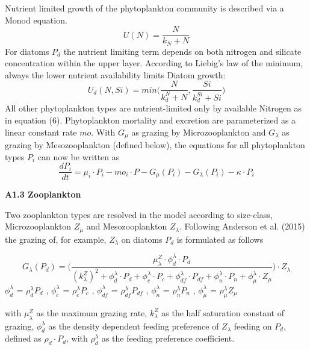 \documentclass[11pt,letterpaper,english]{article}
\begin{document}
Nutrient limited growth of the phytoplankton community is described via a Monod equation. 
\begin{equation}
U(N) = \frac{N} {k_N + N}
\end{equation}
For diatoms $P_d$ the nutrient limiting term depends on both nitrogen and silicate concentration within the upper layer. According to Liebig's law of the minimum, always the lower nutrient availability limits Diatom growth:
\begin{equation}
U_{d}(N,Si) = min \Big( \frac{N} {k_{d}^N + N}, \frac{Si} {k_{d}^{Si} + Si} \Big)
\end{equation}
All other phytoplankton types are nutrient-limited only by available Nitrogen as in equation (6). Phytoplankton mortality and excretion are parameterized as a linear constant rate $mo$. With $G_{\mu}$ as grazing by Microzooplankton and $G_{\lambda}$ as grazing by Mesozooplankton (defined below), the equations for all phytoplankton types $P_i$ can now be written as
\begin{equation}
\frac{dP_{i}}{dt} = \mu_{i} \cdot P_{i} - mo_{i} \cdot P - G_{\mu}(P_{i}) - G_{\lambda}(P_{i}) - \kappa \cdot P_{i}
\end{equation}

{\bf {\large A1.3 Zooplankton}}

Two zooplankton types are resolved in the model according to size-class, Microzooplankton $Z_{\mu}$ and Mesozooplankton $Z_{\lambda}$. Following Anderson et al. (2015) the grazing of, for example, $Z_{\lambda}$ on diatoms $P_d$ is formulated as follows

\begin{equation}
G_{\lambda}(P_{d}) = \Bigg( \frac{\mu^Z_{\lambda} \cdot \phi^{\lambda}_d \cdot P_d} 
							{(k^Z_{\lambda})^2 + \phi^{\lambda}_d \cdot P_d + \phi^{\lambda}_c \cdot P_c + \phi^{\lambda}_{df} \cdot P_{df} + \phi^{\lambda}_{n} \cdot P_{n} + \phi^{\lambda}_{\mu} \cdot Z_{\mu}} \Bigg) \cdot Z_{\lambda}
\end{equation}
$\phi^{\lambda}_{d}$ = $\rho^{\lambda}_{d} P_{d}$ , $\phi^{\lambda}_{c}$ = $\rho^{\lambda}_{c} P_{c}$ , $\phi^{\lambda}_{df}$ = $\rho^{\lambda}_{df} P_{df}$ , $\phi^{\lambda}_{n}$ = $\rho^{\lambda}_{n} P_{n}$ , $\phi^{\lambda}_{\mu}$ = $\rho^{\lambda}_{\mu} Z_{\mu}$

with $\mu^Z_{\lambda}$ as the maximum grazing rate, $k^Z_{\lambda}$ as the half saturation constant of grazing, $\phi^{\lambda}_{d}$ as the density dependent feeding preference of $Z_{\lambda}$ feeding on $P_d$, defined as $\rho_{d} \cdot P_{d}$, with $\rho^{\lambda}_{d}$ as the feeding preference coefficient.
\end{document}
